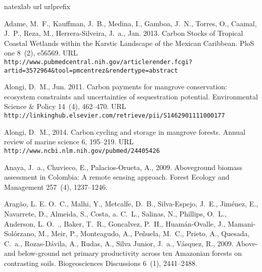 \documentclass[review, authoryear]{elsarticle}   	%
\begin{document}
\begin{thebibliography}{51}
\expandafter\ifx\csname natexlab\endcsname\relax\def\natexlab#1{#1}\fi
\expandafter\ifx\csname url\endcsname\relax
  \def\url#1{\texttt{#1}}\fi
\expandafter\ifx\csname urlprefix\endcsname\relax\def\urlprefix{URL }\fi

Adame, M.~F., Kauffman, J.~B., Medina, I., Gamboa, J.~N., Torres, O., Caamal,
  J.~P., Reza, M., Herrera-Silveira, J.~a., Jan. 2013. {Carbon Stocks of
  Tropical Coastal Wetlands within the Karstic Landscape of the Mexican
  Caribbean.} PloS one 8~(2), e56569.
\newline\urlprefix\url{http://www.pubmedcentral.nih.gov/articlerender.fcgi?artid=3572964\&tool=pmcentrez\&rendertype=abstract}

Alongi, D.~M., Jun. 2011. {Carbon payments for mangrove conservation: ecosystem
  constraints and uncertainties of sequestration potential}. Environmental
  Science \& Policy 14~(4), 462--470.
\newline\urlprefix\url{http://linkinghub.elsevier.com/retrieve/pii/S1462901111000177}

Alongi, D.~M., 2014. {Carbon cycling and storage in mangrove forests.} Annual
  review of marine science 6, 195--219.
\newline\urlprefix\url{http://www.ncbi.nlm.nih.gov/pubmed/24405426}

Anaya, J.~a., Chuvieco, E., Palacios-Orueta, A., 2009. {Aboveground biomass
  assessment in Colombia: A remote sensing approach}. Forest Ecology and
  Management 257~(4), 1237--1246.

Arag\~{a}o, L. E. O.~C., Malhi, Y., Metcalfe, D.~B., Silva-Espejo, J.~E.,
  Jim\'{e}nez, E., Navarrete, D., Almeida, S., Costa, a. C.~L., Salinas, N.,
  Phillips, O.~L., Anderson, L. O.~., Baker, T.~R., Goncalvez, P.~H.,
  Huam\'{a}n-Ovalle, J., Mamani-Sol\'{o}rzano, M., Meir, P., Monteagudo, A.,
  Pe\~{n}uela, M.~C., Prieto, A., Quesada, C.~a., Rozas-D\'{a}vila, A., Rudas,
  A., {Silva Junior}, J.~a., V\'{a}squez, R., 2009. {Above- and below-ground
  net primary productivity across ten Amazonian forests on contrasting soils}.
  Biogeosciences Discussions 6~(1), 2441--2488.


\end{thebibliography}
\end{document}
